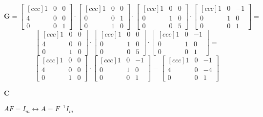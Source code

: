 \documentclass[12pt,a4paper]{article}
\begin{document}
\[
\textbf{G} = 
\begin{bmatrix}[ccc]
  1 & 0 & 0 \\
  4 & 0 & 0 \\
  0 & 0 & 1
\end{bmatrix} \cdot
\begin{bmatrix}[ccc]
  1 & 0 & 0 \\
  0 & 0 & 1 \\
  0 & 1 & 0
\end{bmatrix} \cdot 
\begin{bmatrix}[ccc]
  1 & 0 & 0 \\
  0 & 1 & 0 \\
  0 & 0 & 5
\end{bmatrix} \cdot
\begin{bmatrix}[ccc]
  1 & 0 & -1 \\
  0 & 1 & 0 \\
  0 & 0 & 1
\end{bmatrix} =
\]
\[ 
\begin{bmatrix}[ccc]
  1 & 0 & 0 \\
  4 & 0 & 0 \\
  0 & 1 & 0
\end{bmatrix} \cdot
\begin{bmatrix}[ccc]
  1 & 0 & 0 \\
  0 & 1 & 0 \\
  0 & 0 & 5
\end{bmatrix} \cdot
\begin{bmatrix}[ccc]
  1 & 0 & -1 \\
  0 & 1 & 0 \\
  0 & 0 & 1
\end{bmatrix} =
\]
\[ 
\begin{bmatrix}[ccc]
  1 & 0 & 0 \\
  4 & 0 & 0 \\
  0 & 1 & 0
\end{bmatrix} \cdot
\begin{bmatrix}[ccc]
  1 & 0 & -1 \\
  0 & 1 & 0 \\
  0 & 0 & 1
\end{bmatrix} =
\begin{bmatrix}[ccc]
  1 & 0 & -1 \\
  4 & 0 & -4 \\
  0 & 0 & 1
\end{bmatrix}
\]

\textbf{C}

$AF = I_m \leftrightarrow A = F^{-1} I_m$\\
\end{document}
